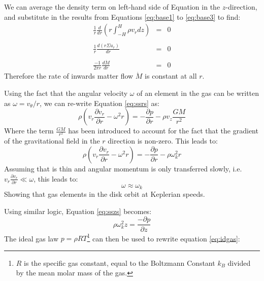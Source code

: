 We can average the density term on left-hand side of Equation \label{eq:ssc} in the $z$-direction, and substitute in the results from Equations \ref{eq:base1} to \ref{eq:base3} to find:
\begin{eqnarray}
\frac{1}{r}\frac{d}{dr}\left(r\int_{-H}^H\rho v_rdz\right)&=&0\\\nonumber\\
\frac{1}{r}\frac{d(r\Sigma u_r)}{dr}&=&0\\\nonumber\\
\frac{-1}{2\pi r}\frac{d\dot{M}}{dr}&=&0
\end{eqnarray}
Therefore the rate of inwards matter flow $\dot{M}$ is constant at all $r$.
\par Using the fact that the angular velocity $\omega$ of an element in the gas can be written as $\omega=v_\theta/r$, we can re-write Equation \ref{eq:ssrs} as:
\begin{equation}
\rho\left(v_r\frac{\partial v_r}{\partial r}-\omega^2r\right)=-\frac{\partial p}{\partial r}-\rho v_z\frac{GM}{r^2}
\end{equation}
Where the term $\frac{GM}{r^2}$ has been introduced to account for the fact that the gradient of the gravitational field in the $r$ direction is non-zero.  This leads to:
\begin{equation}
\rho\left(v_r\frac{\partial v_r}{\partial r}-\omega^2r\right)=-\frac{\partial p}{\partial r}-\rho\omega_k^2r
\end{equation}
Assuming that is thin and angular momentum is only transferred slowly, i.e. $v_r\frac{\partial v_r}{\partial r}\ll\omega$, this leads to:
\begin{equation}
\omega\approx\omega_k
\end{equation}
Showing that gas elements in the disk orbit at Keplerian speeds.
\par Using similar logic, Equation \ref{eq:sszs} becomes:
\begin{equation}
\rho\omega_k^2 z=\frac{-\partial p}{\partial z}\label{eq:idgas}
\end{equation}
The ideal gas law $p=\rho RT$\footnote{$R$ is the specific gas constant, equal to the Boltzmann Constant $k_B$ divided by the mean molar mass of the gas.} can then be used to rewrite equation \ref{eq:idgas}:
